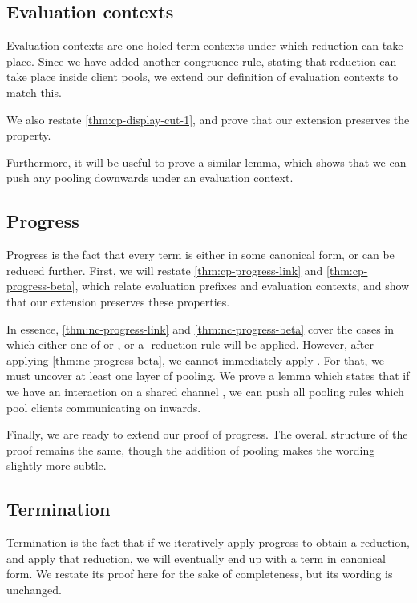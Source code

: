 \subsection{Evaluation contexts}
Evaluation contexts are one-holed term contexts under which reduction can take
place. Since we have added another congruence rule, stating that reduction can
take place inside client pools, we extend our definition of evaluation contexts
to match this.

We also restate \cref{thm:cp-display-cut-1}, and prove that our extension
preserves the property.

Furthermore, it will be useful to prove a similar lemma, which shows that we can
push any pooling downwards under an evaluation context.


\subsection{Progress}
Progress is the fact that every term is either in some canonical form, or can be
reduced further.
First, we will restate \cref{thm:cp-progress-link} and \cref{thm:cp-progress-beta},
which relate evaluation prefixes and evaluation contexts, and show that our
extension preserves these properties. 


In essence, \cref{thm:nc-progress-link} and \cref{thm:nc-progress-beta} cover
the cases in which either one of  or , or a
\textbeta-reduction rule will be applied.
However, after applying \cref{thm:nc-progress-beta}, we cannot immediately apply
. For that, we must uncover at least one layer of pooling.
We prove a lemma which states that if we have an interaction on a shared channel
, we can push all pooling rules which pool clients communicating on 
inwards. 

Finally, we are ready to extend our proof of progress. The overall structure of
the proof remains the same, though the addition of pooling makes the wording
slightly more subtle.


\subsection{Termination}
Termination is the fact that if we iteratively apply progress to obtain a
reduction, and apply that reduction, we will eventually end up with a term in
canonical form.
We restate its proof here for the sake of completeness, but its wording is
unchanged.


